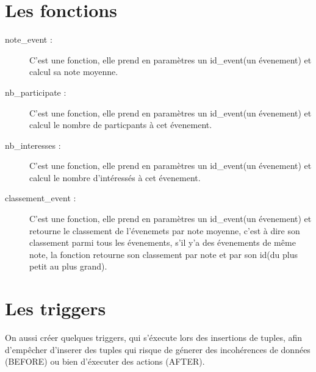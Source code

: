 \documentclass[oneside,11pt,a4paper]{article}
\begin{document}
\section{Les fonctions}
\begin{description}
	
	\item[note\_event : ] C'est une fonction, elle prend en paramètres un id\_event(un évenement) et calcul sa note moyenne.
	
	\item[nb\_participate : ] C'est une fonction, elle prend en paramètres un id\_event(un évenement) et calcul le nombre de particpants à cet évenement.
	
	\item[nb\_interesses : ] C'est une fonction, elle prend en paramètres un id\_event(un évenement) et calcul le nombre d'intéressés à cet évenement.
	\item[classement\_event : ] C'est une fonction, elle prend en paramètres un id\_event(un évenement) et retourne le classement de l'évenemets par note moyenne, c'est à dire son classement parmi tous les évenements, s'il y'a des évenements de même note, la fonction retourne son classement par note et par son id(du plus petit au plus grand).
	
	
\end{description}
\section{Les triggers}

On aussi créer quelques triggers, qui s'éxecute lors des insertions de tuples, afin d'empêcher d'inserer des tuples qui risque de génerer des incohérences de données (BEFORE) ou bien d'éxecuter des actions (AFTER).
\end{document}
